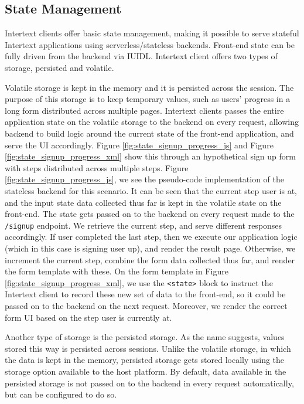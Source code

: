 \subsection{State Management}

Intertext clients offer basic state management, making it possible to serve stateful Intertext applications using serverless/stateless backends. Front-end state can be fully driven from the backend via IUIDL. Intertext client offers two types of storage, persisted and volatile. 

Volatile storage is kept in the memory and it is persisted across the session. The purpose of this storage is to keep temporary values, such as users' progress in a long form distributed across multiple pages. Intertext clients passes the entire application state on the volatile storage to the backend on every request, allowing backend to build logic around the current state of the front-end application, and serve the UI accordingly. Figure \ref{fig:state_signup_progress_js} and Figure \ref{fig:state_signup_progress_xml} show this through an hypothetical sign up form with steps distributed across multiple steps. Figure \ref{fig:state_signup_progress_js}, we see the pseudo-code implementation of the stateless backend for this scenario. It can be seen that the current step user is at, and the input state data collected thus far is kept in the volatile state on the front-end. The state gets passed on to the backend on every request made to the \texttt{/signup} endpoint. We retrieve the current step, and serve different responses accordingly. If user completed the last step, then we execute our application logic (which in this case is signing user up), and render the result page. Otherwise, we increment the current step, combine the form data collected thus far, and render the form template with these. On the form template in Figure \ref{fig:state_signup_progress_xml}, we use the \texttt{<state>} block to instruct the Intertext client to record these new set of data to the front-end, so it could be passed on to the backend on the next request. Moreover, we render the correct form UI based on the step user is currently at.

Another type of storage is the persisted storage. As the name suggests, values stored this way is persisted across sessions. Unlike the volatile storage, in which the data is kept in the memory, persisted storage gets stored locally using the storage option available to the host platform. By default, data available in the persisted storage is not passed on to the backend in every request automatically, but can be configured to do so.

